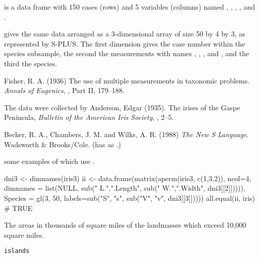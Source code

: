 %
\begin{Format}
 is a data frame with 150 cases (rows) and 5 variables
(columns) named , ,
, , and .

 gives the same data arranged as a 3-dimensional array
of size 50 by 4 by 3, as represented by S-PLUS.  The first dimension
gives the case number within the species subsample, the second the
measurements with names , ,
, and , and the third the species.
\end{Format}
%
\begin{Source}\relax
Fisher, R. A. (1936)
The use of multiple measurements in taxonomic problems.
\emph{Annals of Eugenics},
, Part II, 179--188.

The data were collected by
Anderson, Edgar (1935).
The irises of the Gaspe Peninsula,
\emph{Bulletin of the American Iris Society},
, 2--5.
\end{Source}
%
\begin{References}\relax
Becker, R. A., Chambers, J. M. and Wilks, A. R. (1988)
\emph{The New S Language}.
Wadsworth \& Brooks/Cole. (has  as .)
\end{References}
%
\begin{SeeAlso}\relax
{} some examples of which use
.
\end{SeeAlso}
%
\begin{Examples}
\begin{ExampleCode}
dni3 <- dimnames(iris3)
ii <- data.frame(matrix(aperm(iris3, c(1,3,2)), ncol=4,
                        dimnames = list(NULL, sub(" L.",".Length",
                                        sub(" W.",".Width", dni3[[2]])))),
    Species = gl(3, 50, labels=sub("S", "s", sub("V", "v", dni3[[3]]))))
all.equal(ii, iris) # TRUE
\end{ExampleCode}
\end{Examples}
%
\begin{Description}\relax
The areas in thousands of square miles of the landmasses which exceed
10,000 square miles.
\end{Description}
%
\begin{Usage}
\begin{verbatim}
islands
\end{verbatim}
\end{Usage}
